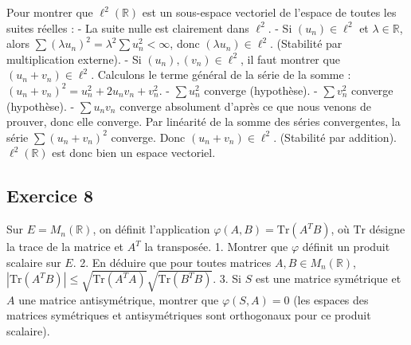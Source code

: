 \documentclass[11pt,a4paper]{report}
\begin{document}
Pour montrer que $\ell^2(\mathbb{R})$ est un sous-espace vectoriel de l'espace de toutes les suites réelles :
- La suite nulle est clairement dans $\ell^2$.
- Si $(u_n) \in \ell^2$ et $\lambda \in \mathbb{R}$, alors $\sum (\lambda u_n)^2 = \lambda^2 \sum u_n^2 < \infty$, donc $(\lambda u_n) \in \ell^2$. (Stabilité par multiplication externe).
- Si $(u_n), (v_n) \in \ell^2$, il faut montrer que $(u_n + v_n) \in \ell^2$.
  Calculons le terme général de la série de la somme :
  $(u_n + v_n)^2 = u_n^2 + 2u_nv_n + v_n^2$.
  - $\sum u_n^2$ converge (hypothèse).
  - $\sum v_n^2$ converge (hypothèse).
  - $\sum u_nv_n$ converge absolument d'après ce que nous venons de prouver, donc elle converge.
  Par linéarité de la somme des séries convergentes, la série $\sum (u_n + v_n)^2$ converge.
  Donc $(u_n + v_n) \in \ell^2$. (Stabilité par addition).
$\ell^2(\mathbb{R})$ est donc bien un espace vectoriel.

\subsection*{Exercice 8}

Sur $E = M_n(\mathbb{R})$, on définit l'application $\varphi(A, B) = \text{Tr}(A^T B)$, où $\text{Tr}$ désigne la trace de la matrice et $A^T$ la transposée.
1. Montrer que $\varphi$ définit un produit scalaire sur $E$.
2. En déduire que pour toutes matrices $A, B \in M_n(\mathbb{R})$, $|\text{Tr}(A^T B)| \le \sqrt{\text{Tr}(A^T A)} \sqrt{\text{Tr}(B^T B)}$.
3. Si $S$ est une matrice symétrique et $A$ une matrice antisymétrique, montrer que $\varphi(S, A) = 0$ (les espaces des matrices symétriques et antisymétriques sont orthogonaux pour ce produit scalaire).
\end{document}
